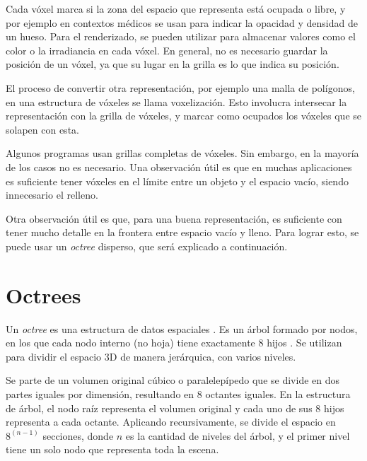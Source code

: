 

Cada vóxel marca si la zona del espacio que representa está ocupada o libre, y por ejemplo en contextos médicos se usan para indicar la opacidad y densidad de un hueso.
Para el renderizado, se pueden utilizar para almacenar valores como el color o la irradiancia en cada vóxel.
En general, no es necesario guardar la posición de un vóxel, ya que su lugar en la grilla es lo que indica su posición.

El proceso de convertir otra representación, por ejemplo una malla de polígonos, en una estructura de vóxeles se llama voxelización.
Esto involucra intersecar la representación con la grilla de vóxeles, y marcar como ocupados los vóxeles que se solapen con esta.

Algunos programas usan grillas completas de vóxeles.
Sin embargo, en la mayoría de los casos no es necesario.
Una observación útil es que en muchas aplicaciones es suficiente tener vóxeles en el límite entre un objeto y el espacio vacío, siendo innecesario el relleno.

Otra observación útil es que, para una buena representación, es suficiente con tener mucho detalle en la frontera entre espacio vacío y lleno.
Para lograr esto, se puede usar un \textit{octree} disperso, que será explicado a continuación.

\section{Octrees}\label{sec:octree}

Un \textit{octree} es una estructura de datos espaciales \cite{octree-textures}.
Es un árbol formado por nodos, en los que cada nodo interno (no hoja) tiene exactamente $8$ hijos \cite{rtr}.
Se utilizan para dividir el espacio 3D de manera jerárquica, con varios niveles.

Se parte de un volumen original cúbico o paralelepípedo que se divide en dos partes iguales por dimensión, resultando en $8$ octantes iguales.
En la estructura de árbol, el nodo raíz representa el volumen original y cada uno de sus $8$ hijos representa a cada octante.
Aplicando recursivamente, se divide el espacio en $8^{(n - 1)}$ secciones, donde $n$ es la cantidad de niveles del árbol, y el primer nivel tiene un solo nodo que representa toda la escena.

